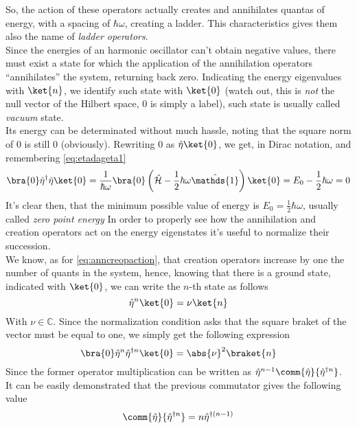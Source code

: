 \documentclass[a4paper, 11pt]{book}
\newcommand{\1}{\opr{\mathds{1}}}
\newcommand{\ham}{\mathcal{H}}
\newcommand{\opr}[1]{\hat{#1}}
\newcommand{\adj}[2][]{#2^{\dagger#1}}
\theoremstyle{plain}
\begin{document}
	So, the action of these operators actually creates and annihilates quantas of energy, with a spacing of $\hbar\omega$, creating a ladder. This characteristics gives them also the name of \textit{ladder operators}.\\
	Since the energies of an harmonic oscillator can't obtain negative values, there must exist a state for which the application of the annihilation operators ``annihilates'' the system, returning back zero. Indicating the energy eigenvalues with $\ket{n}$, we identify such state with $\ket{0}$ (watch out, this is \emph{not} the null vector of the Hilbert space, $0$ is simply a label), such state is usually called \textit{vacuum} state.\\
	Its energy can be determinated without much hassle, noting that the square norm of $0$ is still $0$ (obviously). Rewriting $0$ as $\opr{\eta}\ket{0}$, we get, in Dirac notation, and remembering \eqref{eq:etadageta1}
	\begin{equation}
		\bra{0}\adj{\opr{\eta}}\opr{\eta}\ket{0}=\frac{1}{\hbar\omega}\bra{0}\left( \opr{\ham}-\frac{1}{2}\hbar\omega\1 \right)\ket{0}=E_0-\frac{1}{2}\hbar\omega=0
		\label{eq:zeropointenergy}
	\end{equation}
	It's clear then, that the minimum possible value of energy is $E_0=\frac{1}{2}\hbar\omega$, usually called \textit{zero point energy}
	In order to properly see how the annihilation and creation operators act on the energy eigenstates it's useful to normalize their succession.\\
	We know, as for \eqref{eq:anncreopaction}, that creation operators increase by one the number of quants in the system, hence, knowing that there is a ground state, indicated with $\ket{0}$, we can write the $n$-th state as follows
	\begin{equation*}
		\opr{\eta}^n\ket{0}=\nu\ket{n}
	\end{equation*}
	With $\nu\in\mathbb{C}$. Since the normalization condition asks that the square braket of the vector must be equal to one, we simply get the following expression
	\begin{equation}
		\bra{0}\opr{\eta}^n\adj[n]{\opr{\eta}}\ket{0}=\abs{\nu}^2\braket{n}
		\label{eq:normcondqho}
	\end{equation}
	Since the former operator multiplication can be written as $\opr{\eta}^{n-1}\comm{\opr{\eta}}{\adj[n]{\opr{\eta}}}$. It can be easily demonstrated that the previous commutator gives the following value
	\begin{equation*}
		\comm{\opr{\eta}}{\adj[n]{\opr{\eta}}}=n\adj[(n-1)]{\opr{\eta}}
	\end{equation*}
\end{document}
